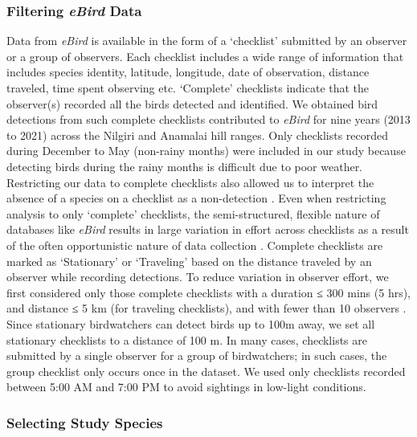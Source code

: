 \subsubsection*{Filtering \textit{eBird} Data}

Data from \textit{eBird} is available in the form of a `checklist' submitted by an observer or a group of observers.
Each checklist includes a wide range of information that includes species identity, latitude, longitude, date of observation, distance traveled, time spent observing etc.
`Complete' checklists indicate that the observer(s) recorded all the birds detected and identified.
We obtained bird detections from such complete checklists contributed to \textit{eBird} for nine years (2013 to 2021) across the Nilgiri and Anamalai hill ranges.
Only checklists recorded during December to May (non-rainy months) were included in our study because detecting birds during the rainy months is difficult due to poor weather.
Restricting our data to complete checklists also allowed us to interpret the absence of a species on a checklist as a non-detection \citep[called zero-filling][]{johnston2021}.
Even when restricting analysis to only `complete' checklists, the semi-structured, flexible nature of databases like \textit{eBird} results in large variation in effort across checklists as a result of the often opportunistic nature of data collection \citep{kelling2019}.
Complete checklists are marked as `Stationary' or `Traveling' based on the distance traveled by an observer while recording detections.
To reduce variation in observer effort, we first considered only those complete checklists with a duration ≤ 300 mins (5 hrs), and distance ≤ 5 km (for traveling checklists), and with fewer than 10 observers \citep[following][]{johnston2019}.
Since stationary birdwatchers can detect birds up to 100m away, we set all stationary checklists to a distance of 100 m.
In many cases, checklists are submitted by a single observer for a group of birdwatchers; in such cases, the group checklist only occurs once in the dataset.
We used only checklists recorded between 5:00 AM and 7:00 PM to avoid sightings in low-light conditions.

\subsubsection*{Selecting Study Species}

